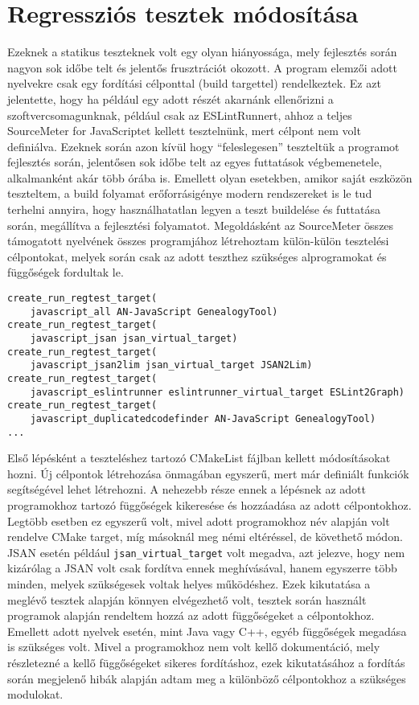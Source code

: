 \section{Regressziós tesztek módosítása}

Ezeknek a statikus teszteknek volt egy olyan hiányossága, mely fejlesztés során nagyon sok időbe telt és jelentős frusztrációt okozott. A program elemzői adott nyelvekre csak egy fordítási célponttal (build targettel) rendelkeztek. Ez azt jelentette, hogy ha például egy adott részét akarnánk ellenőrizni a szoftvercsomagunknak, például csak az ESLintRunnert, ahhoz a teljes SourceMeter for JavaScriptet kellett tesztelnünk, mert célpont nem volt definiálva. Ezeknek során azon kívül hogy ``feleslegesen'' teszteltük a programot fejlesztés során, jelentősen sok időbe telt az egyes futtatások végbemenetele, alkalmanként akár több órába is. Emellett olyan esetekben, amikor saját eszközön teszteltem, a build folyamat erőforrásigénye modern rendszereket is le tud terhelni annyira, hogy használhatatlan legyen a teszt buildelése és futtatása során, megállítva a fejlesztési folyamatot.
Megoldásként az SourceMeter összes támogatott nyelvének összes programjához létrehoztam külön-külön tesztelési célpontokat, melyek során csak az adott teszthez szükséges alprogramokat és függőségek fordultak le.

\begin{lstlisting}[caption={CMake célpontok JavaScript teszteléshez},label={lst:abs-computedfiltering}, style={CStyle}]
create_run_regtest_target(
    javascript_all AN-JavaScript GenealogyTool)
create_run_regtest_target(
    javascript_jsan jsan_virtual_target)
create_run_regtest_target(
    javascript_jsan2lim jsan_virtual_target JSAN2Lim)
create_run_regtest_target(
    javascript_eslintrunner eslintrunner_virtual_target ESLint2Graph)
create_run_regtest_target(
    javascript_duplicatedcodefinder AN-JavaScript GenealogyTool)
...
\end{lstlisting}
    
Első lépésként a teszteléshez tartozó CMakeList fájlban kellett módosításokat hozni. Új célpontok létrehozása önmagában egyszerű, mert már definiált funkciók segítségével lehet létrehozni. A nehezebb része ennek a lépésnek az adott programokhoz tartozó függőségek kikeresése és hozzáadása az adott célpontokhoz. Legtöbb esetben ez egyszerű volt, mivel adott programokhoz név alapján volt rendelve CMake target, míg másoknál meg némi eltéréssel, de követhető módon. JSAN esetén például \texttt{jsan\_virtual\_target} volt megadva, azt jelezve, hogy nem kizárólag a JSAN volt csak fordítva ennek meghívásával, hanem egyszerre több minden, melyek szükségesek voltak helyes működéshez. Ezek kikutatása a meglévő tesztek alapján könnyen elvégezhető volt, tesztek során használt programok alapján rendeltem hozzá az adott függőségeket a célpontokhoz. Emellett adott nyelvek esetén, mint Java vagy C++, egyéb függőségek megadása is szükséges volt. Mivel a programokhoz nem volt kellő dokumentáció, mely részletezné a kellő függőségeket sikeres fordításhoz, ezek kikutatásához a fordítás során megjelenő hibák alapján adtam meg a különböző célpontokhoz a szükséges modulokat. 

